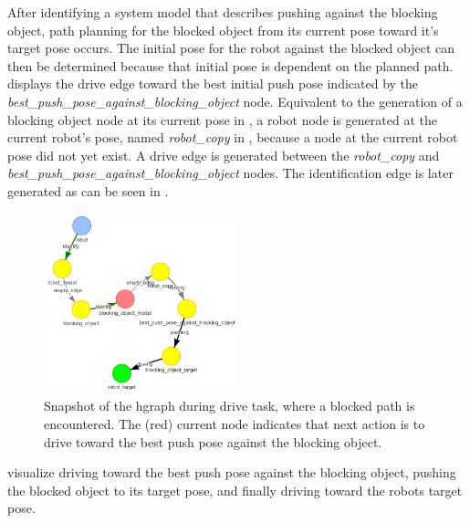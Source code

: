 After identifying a system model that describes pushing against the blocking object, path planning for the blocked object from its current pose toward it's target pose occurs. The initial pose for the robot against the blocked object can then be determined because that initial pose is dependent on the planned path.  displays the drive edge toward the best initial push pose indicated by the \textit{best\_push\_pose\_against\_blocking\_object} node. Equivalent to the generation of a blocking object node at its current pose in , a robot node is generated at the current robot's pose, named \textit{robot\_copy} in , because a node at the current robot pose did not yet exist. A drive edge is generated between the \textit{robot\_copy} and \textit{best\_push\_pose\_against\_blocking\_object} nodes. The identification edge is later generated as can be seen in .\bs

\begin{figure}[H]
    \centering
    \includegraphics[width=0.5\textwidth]{figures/proposed_method/connecting_nodes/blocking_obj/blocking_obj_4}
    \caption{Snapshot of the \ac{hgraph} during drive task, where a blocked path is encountered. The (red) current node indicates that next action is to drive toward the best push pose against the blocking object.}\label{subfig:blocking_obj_4}
\end{figure}

 visualize driving toward the best push pose against the blocking object, pushing the blocked object to its target pose, and finally driving toward the robots target pose.\bs

